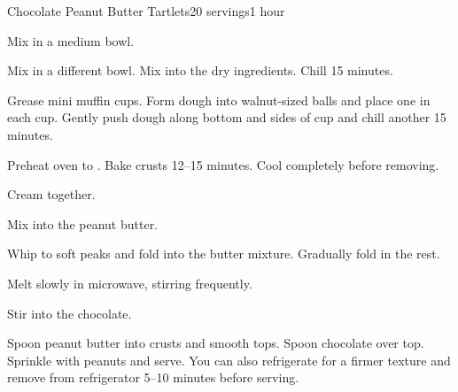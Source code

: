 \documentclass[../Cookbook.tex]{subfiles}
\begin{document}
\begin{recipe}{Chocolate Peanut Butter Tartlets}{20 servings}{1 hour}

Mix in a medium bowl.

Mix in a different bowl. Mix into the dry ingredients. Chill 15 minutes.

Grease mini muffin cups. Form dough into walnut-sized balls and place one in each cup. Gently push dough along bottom and sides of cup and chill another 15 minutes.

Preheat oven to . Bake crusts 12--15 minutes. Cool completely before removing.

Cream together.

Mix into the peanut butter.

Whip to soft peaks and fold  into the butter mixture. Gradually fold in the rest.

Melt slowly in microwave, stirring frequently.

Stir into the chocolate.

Spoon peanut butter into crusts and smooth tops. Spoon chocolate over top. Sprinkle with peanuts and serve.
You can also refrigerate for a firmer texture and remove from refrigerator 5--10 minutes before serving.

\end{recipe}
\end{document}
